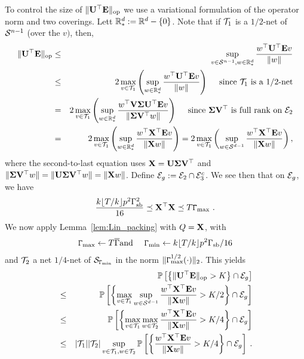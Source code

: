 To control the size of $\lVert \mathbf{U}^\top \mathbf{E} \rVert_{\mathrm{op}}$ we use a variational formulation of the operator norm and two coverings. Lett $\mathbb{R}_*^d := \mathbb{R}^d - \{0\}$. Note that if $\mathcal{T}_1$ is a $1/2$-net of $\mathcal{S}^{n-1}$ (over the $v)$, then, 
\begin{eqnarray*}
\lVert \mathbf{U}^\top \mathbf{E} \rVert_{\mathrm{op}} &\le&  \sup_{v \in \mathcal{S}^{n-1}, w \in \mathbb{R}_*^{d}} \frac{w^{\top}\mathbf{U}^{\top} \mathbf{E} v}{\|w\|} \\
\ &\le&  2\max_{v \in \mathcal{T}_1}\left(\sup_{w \in \mathbb{R}_*^{d}} \frac{w^{\top}\mathbf{U}^{\top} \mathbf{E} v }{\|w\|}  \right)\quad \text{ since } \mathcal{T}_1  \text{ is a } 1/2 \text{-net} \\
&=&  2\max_{v \in \mathcal{T}_1} \left(\sup_{w \in \mathbb{R}_*^{d}} \frac{w^{\top}\mathbf{V}\mathbf{\Sigma}\mathbf{U}^{\top} \mathbf{E} v }{\| \mathbf{\Sigma} \mathbf{V}^\top w\|} \right) \quad \text{ since }\mathbf{\Sigma}\mathbf{V}^{\top} \text{ is full rank on } \mathcal{E}_2\\
&=& 2 \max_{v \in \mathcal{T}_1}\left(\sup_{w \in \mathbb{R}_*^{d}} \frac{w^{\top}\mathbf{X}^{\top} \mathbf{E} v }{\|\mathbf{X} w\|}\right) = 2 \max_{v \in \mathcal{T}_1}\left(\sup_{w \in \mathcal{S}^{d-1}} \frac{w^{\top}\mathbf{X}^{\top} \mathbf{E} v }{\|\mathbf{X} w\|}\right),
\end{eqnarray*}
where the second-to-last equation uses $\mathbf{X} = \mathbf{U} \mathbf{\Sigma} \mathbf{V}^{\top}$ and $\|\mathbf{\Sigma} \mathbf{V}^\top w\| = \|\mathbf{U} \mathbf{\Sigma} \mathbf{V}^\top w\| = \|\mathbf{X} w\|$. Define $\mathcal{E}_g := \mathcal{E}_2 \cap \mathcal{E}_3^c$. We see then that on $\mathcal{E}_g$, we have 
\begin{eqnarray*}
\frac{k\lfloor T/k\rfloor p^2 \Gamma_{\mathrm{sb}}^2 }{16} \preceq \mathbf{X}^\top\mathbf{X} \preceq T\mathtt{\Gamma}_{\max}~.
\end{eqnarray*}
We now apply Lemma~\ref{lem:Lin_packing} with $Q =  \mathbf{X}$, with 
\begin{eqnarray}\label{Gam:def}
\mathtt{\Gamma}_{\max} \leftarrow T\overline{\Gamma} & \text{and } & \mathtt{\Gamma}_{\min} \leftarrow k \lfloor T/k\rfloor p^2 \Gamma_{\mathrm{sb}}/16
\end{eqnarray}
and $\mathcal{T}_2$ a net $1/4$-net of $\mathcal{S}_{\mathtt{\Gamma}_{\min}}$ in the norm $\|\mathtt{\Gamma}_{\max}^{1/2}(\cdot)\|_2$. This yields
\begin{eqnarray*}
&&\mathbb{P}\left[\left\{\lVert \mathbf{U}^\top \mathbf{E} \rVert_{\mathrm{op}} > K\right\} \cap \mathcal{E}_g\right] \\
&\le& \mathbb{P}\left[\left\{\max_{v \in \mathcal{T}_1} \sup_{w \in \mathcal{S}^{d-1}}\frac{w^{\top}\mathbf{X}^{\top} \mathbf{E} v }{\|\mathbf{X} w\|} > K/2\right\} \cap \mathcal{E}_g\right] \\
&\le& \mathbb{P}\left[\left\{\max_{v \in \mathcal{T}_1} \max_{w \in \mathcal{T}_2}\frac{w^{\top}\mathbf{X}^{\top} \mathbf{E} v }{\|\mathbf{X} w\|} > K/4\right\} \cap \mathcal{E}_g\right] \\
&\le& |\mathcal{T}_1||\mathcal{T}_2|\sup_{v \in \mathcal{T}_1,w \in \mathcal{T}_2} \mathbb{P}\left[\left\{\frac{w^{\top}\mathbf{X}^{\top} \mathbf{E} v }{\|\mathbf{X} w\|} > K/4\right\} \cap \mathcal{E}_g\right] \:.
\end{eqnarray*}
